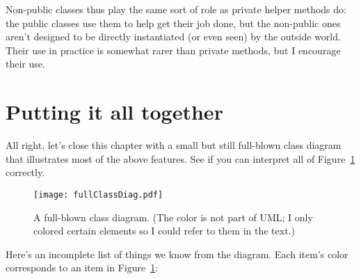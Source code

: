 Non-public classes thus play the same sort of role as private helper methods
do: the public classes use them to help get their job done, but the non-public
ones aren't designed to be directly instantiated (or even seen) by the outside
world. Their use in practice is somewhat rarer than private methods, but I
encourage their use.


\pagebreak
\section{Putting it all together}

All right, let's close this chapter with a small but still full-blown class
diagram that illustrates most of the above features. See if you can interpret
all of Figure~\ref{fig:fullClassDiag} correctly.

\begin{figure}[ht]
\centering
\texttt{[image: fullClassDiag.pdf]}   %
\smallskip
\caption{A full-blown class diagram. (The color is not part of UML; I only
colored certain elements so I could refer to them in the text.)}
\label{fig:fullClassDiag}
\end{figure}

Here's an incomplete list of things we know from the diagram. Each item's
color corresponds to an item in Figure~\ref{fig:fullClassDiag}:

